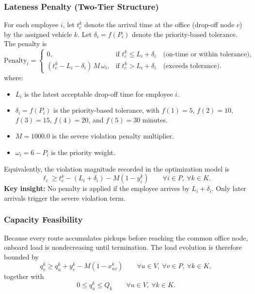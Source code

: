 \documentclass[11pt,a4paper]{article}
\begin{document}
\subsubsection{Lateness Penalty (Two-Tier Structure)}
For each employee $i$, let $t_c^k$ denote the arrival time at the office (drop-off node $c$) by the assigned vehicle $k$. Let $\delta_i=f(P_i)$ denote the priority-based tolerance. The penalty is
\begin{equation}
\mathrm{Penalty}_i=
\begin{cases}
0, & \text{if } t_c^k \le L_i+\delta_i \quad \text{(on-time or within tolerance)}, \\[4pt]
(t_c^k-L_i-\delta_i)\,M\,\omega_i, & \text{if } t_c^k > L_i+\delta_i \quad \text{(exceeds tolerance)} .
\end{cases}
\label{eq:two-tier-penalty}
\end{equation}
where:
\begin{itemize}[leftmargin=16pt,itemsep=2pt]
  \item $L_i$ is the latest acceptable drop-off time for employee $i$.
  \item $\delta_i=f(P_i)$ is the priority-based tolerance, with $f(1)=5$, $f(2)=10$, $f(3)=15$, $f(4)=20$, and $f(5)=30$ minutes.
  \item $M=1000.0$ is the severe violation penalty multiplier.
  \item $\omega_i = 6-P_i$ is the priority weight.
\end{itemize}
Equivalently, the violation magnitude recorded in the optimization model is
\begin{equation}
\ell_i \ge t_c^k-(L_i+\delta_i)-M(1-y_i^k)
\qquad \forall i\in P,\ \forall k\in K .
\label{eq:lateness}
\end{equation}
\noindent\textbf{Key insight:} No penalty is applied if the employee arrives by $L_i+\delta_i$. Only later arrivals trigger the severe violation term.

\subsubsection{Capacity Feasibility}
Because every route accumulates pickups before reaching the common office node, onboard load is nondecreasing until termination. The load evolution is therefore bounded by
\begin{equation}
q_v^k \ge q_u^k + y_v^k - M(1-x_{uv}^k)
\qquad \forall u\in V,\ \forall v\in P,\ \forall k\in K ,
\label{eq:load-prop}
\end{equation}
together with
\begin{equation}
0 \le q_u^k \le Q_k
\qquad \forall u\in V,\ \forall k\in K .
\label{eq:capacity}
\end{equation}
\end{document}
